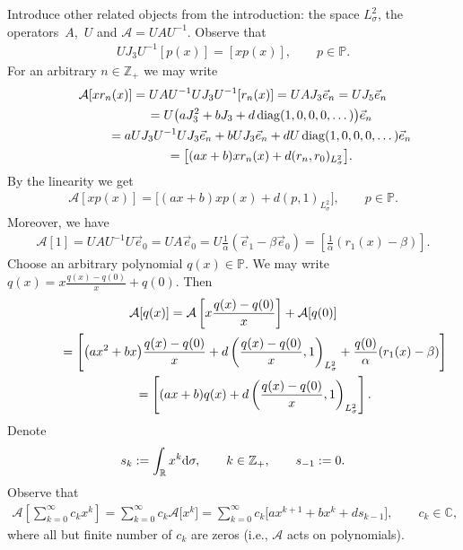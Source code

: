 \documentclass[pdftex]{sigma}
\numberwithin{equation}{section}
\begin{document}
Introduce other related objects from the introduction: the space $L^2_\sigma$, the operators~$A$,~$U$ and $\mathcal{A} = UAU^{-1}$. Observe that
\begin{gather*} U J_3 U^{-1} [p(x)] = [xp(x)],\qquad p\in\mathbb{P}. \end{gather*}
For an arbitrary $n\in\mathbb{Z}_+$ we may write
\begin{gather*} \mathcal{A} [x r_n(x)] = UAU^{-1} U J_3 U^{-1} [r_n(x)] = UAJ_3 \vec e_n = U J_5 \vec e_n \\
\hphantom{\mathcal{A} [x r_n(x)]}{} = U \big( a J_3^2 + b J_3 + d \operatorname{diag} (1,0,0,0,\dots ) \big) \vec e_n \\
\hphantom{\mathcal{A} [x r_n(x)]}{} = a U J_3 U^{-1} U J_3 \vec e_n + bUJ_3 \vec e_n + d U \operatorname{diag} (1,0,0,0,\dots ) \vec e_n \\
\hphantom{\mathcal{A} [x r_n(x)]}{} = \big[(ax+b)x r_n(x) + d (r_n,r_0)_{L^2_\sigma}\big].
\end{gather*}
By the linearity we get
\begin{gather*} \mathcal{A} [xp(x)] = \big[(ax+b)x p(x) + d (p,1)_{L^2_\sigma}\big],\qquad p\in\mathbb{P}. \end{gather*}
Moreover, we have
\begin{gather*} \mathcal{A}[1] = UAU^{-1} U\vec e_0 = UA\vec e_0 = U \frac{1}{\alpha} (\vec e_1 - \beta \vec e_0) = \left[\frac{1}{\alpha} (r_1(x) - \beta) \right].
\end{gather*}
Choose an arbitrary polynomial $q(x)\in\mathbb{P}$. We may write $q(x)= x \frac{q(x)-q(0)}{x} + q(0)$. Then
\begin{gather*} \mathcal{A} [q(x)] = \mathcal{A} \left[ x \frac{q(x)-q(0)}{x} \right] + \mathcal{A} [q(0)] \\
\hphantom{\mathcal{A} [q(x)]}{} = \left[\big(ax^2 +bx\big) \frac{q(x)-q(0)}{x} + d \left( \frac{q(x)-q(0)}{x}, 1 \right)_{L^2_\sigma} + \frac{q(0)}{\alpha} (r_1(x)-\beta) \right] \\
\hphantom{\mathcal{A} [q(x)]}{} = \left[ (ax+b) q(x) + d \left( \frac{q(x)-q(0)}{x}, 1 \right)_{L^2_\sigma} \right].
\end{gather*}
Denote
\begin{gather*} s_k := \int_{\mathbb{R}} x^k {\rm d}\sigma,\qquad k\in\mathbb{Z}_+,\qquad s_{-1}:=0. \end{gather*}
Observe that
\begin{gather*} \mathcal{A} \left[\sum_{k=0}^\infty c_k x^k \right] = \sum_{k=0}^\infty c_k \mathcal{A} \big[x^k\big]
 = \sum_{k=0}^\infty c_k \big[ ax^{k+1} + bx^k + d s_{k-1} \big],\qquad c_k\in\mathbb{C},
\end{gather*}
where all but f\/inite number of $c_k$ are zeros (i.e., $\mathcal{A}$ acts on polynomials).
\end{document}

